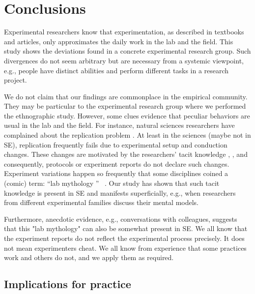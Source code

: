 \section{Conclusions}\label{sec-conclusions}
Experimental researchers know that experimentation, as described in textbooks and articles, only approximates the daily work in the lab and the field. This study shows the deviations found in a concrete experimental research group. Such divergences do not seem arbitrary but are necessary from a systemic viewpoint, e.g., people have distinct abilities and perform different tasks in a research project.

We do not claim that our findings are commonplace in the empirical community. They may be particular to the experimental research group where we performed the ethnographic study. However, some clues evidence that peculiar behaviors are usual in the lab and the field. For instance, natural sciences researchers have complained about the replication problem \cite{hines2014sorting}. At least in the sciences (maybe not in SE), replication frequently fails due to experimental setup and conduction changes. These changes are motivated by the researchers' tacit knowledge \cite{Polanyi-1996-tacit-k}, \cite{Shull-2002-replicating-SE-experiments-tacit-k}, and consequently, protocols or experiment reports do not declare such changes. Experiment variations happen so frequently that some disciplines coined a (comic) term: \textquotedblleft lab mythology \textquotedblright~\cite{ruben2011experimental} \cite{loukides2015beyond}. Our study has shown that such tacit knowledge is present in SE and manifests superficially, e.g., when researchers from different experimental families discuss their mental models.

Furthermore, anecdotic evidence, e.g., conversations with colleagues, suggests that this "lab mythology" can also be somewhat present in SE. We all know that the experiment reports do not reflect the experimental process precisely. It does not mean experimenters cheat. We all know from experience that some practices work and others do not, and we apply them as required.

\subsection{Implications for practice}



